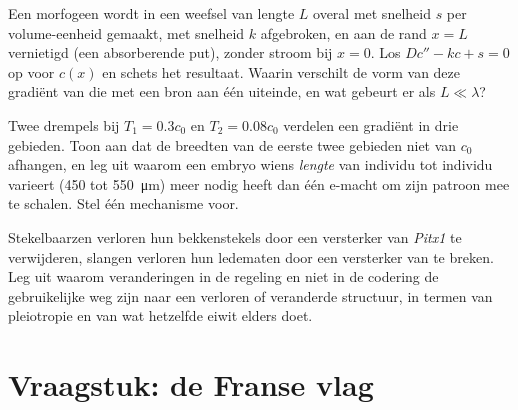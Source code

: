 \begin{exercise}[$\star\star\star$]\label{exo:b3:developmental-genetics:10}
Een morfogeen wordt in een weefsel van lengte $L$ overal met snelheid
$s$ per volume-eenheid gemaakt, met snelheid $k$ afgebroken, en aan de
rand $x =
L$ vernietigd (een absorberende put), zonder stroom bij $x = 0$. Los
$Dc'' - kc + s =
0$ op voor $c(x)$ en schets het resultaat. Waarin verschilt de vorm van
deze gradiënt van die met een bron aan één uiteinde, en wat gebeurt er
als $L \ll \lambda$?
\end{exercise}

\begin{exercise}[$\star\star\star$]\label{exo:b3:developmental-genetics:11}
Twee drempels bij $T_{1} = 0.3c_{0}$ en $T_{2} = 0.08c_{0}$ verdelen
een gradiënt in drie gebieden. Toon aan dat de breedten van de eerste
twee gebieden niet van $c_{0}$ afhangen, en leg uit waarom een embryo
wiens \emph{lengte} van individu tot individu varieert (\qty{450}{} tot
\qty{550}{\micro m}) meer nodig heeft dan één e-macht om zijn patroon
mee te schalen. Stel één mechanisme voor.
\end{exercise}

\begin{exercise}[$\star\star\star$]\label{exo:b3:developmental-genetics:12}
Stekelbaarzen verloren hun bekkenstekels door een versterker van
\emph{Pitx1} te verwijderen, slangen verloren hun ledematen door een
versterker van \emph{} te breken. Leg uit waarom
veranderingen in de regeling en niet in de codering de gebruikelijke
weg zijn naar een verloren of veranderde structuur, in termen van
pleiotropie en van wat hetzelfde eiwit elders doet.
\end{exercise}

\section{Vraagstuk: de Franse vlag}

